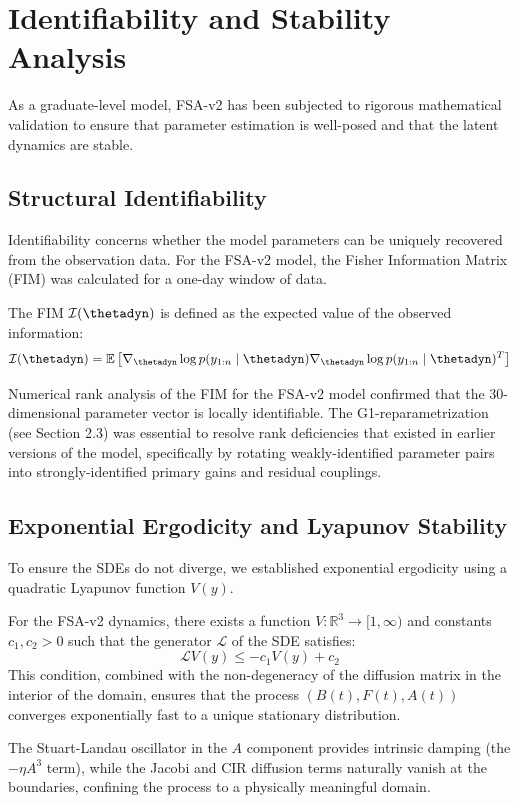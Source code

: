 \section{Identifiability and Stability Analysis}

As a graduate-level model, FSA-v2 has been subjected to rigorous mathematical validation to ensure that parameter estimation is well-posed and that the latent dynamics are stable.

\subsection{Structural Identifiability}

Identifiability concerns whether the model parameters can be uniquely recovered from the observation data. For the FSA-v2 model, the Fisher Information Matrix (FIM) was calculated for a one-day window of data.

\begin{definition}
The FIM $\mathcal{I}(\thetadyn)$ is defined as the expected value of the observed information:
\begin{equation}
    \mathcal{I}(\thetadyn) = \mathbb{E} \left[ \nabla_{\thetadyn} \log p(y_{1:n} \mid \thetadyn) \nabla_{\thetadyn} \log p(y_{1:n} \mid \thetadyn)^T \right]
\end{equation}
\end{definition}

Numerical rank analysis of the FIM for the FSA-v2 model confirmed that the 30-dimensional parameter vector is locally identifiable. The G1-reparametrization (see Section 2.3) was essential to resolve rank deficiencies that existed in earlier versions of the model, specifically by rotating weakly-identified parameter pairs into strongly-identified primary gains and residual couplings.

\subsection{Exponential Ergodicity and Lyapunov Stability}

To ensure the SDEs do not diverge, we established exponential ergodicity using a quadratic Lyapunov function $V(y)$. 

\begin{theorem}
For the FSA-v2 dynamics, there exists a function $V: \mathbb{R}^3 \to [1, \infty)$ and constants $c_1, c_2 > 0$ such that the generator $\mathcal{L}$ of the SDE satisfies:
\begin{equation}
    \mathcal{L}V(y) \le -c_1 V(y) + c_2
\end{equation}
This condition, combined with the non-degeneracy of the diffusion matrix in the interior of the domain, ensures that the process $(B(t), F(t), A(t))$ converges exponentially fast to a unique stationary distribution.
\end{theorem}

The Stuart-Landau oscillator in the $A$ component provides intrinsic damping (the $-\eta A^3$ term), while the Jacobi and CIR diffusion terms naturally vanish at the boundaries, confining the process to a physically meaningful domain.
